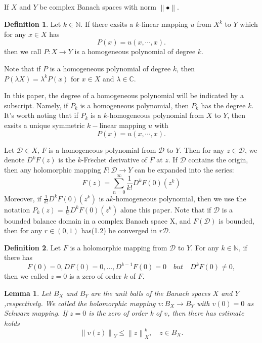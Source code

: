 \documentclass{birkjour}
\theoremstyle{plain}
\newtheorem{lem}{Lemma}
\theoremstyle{definition}
\newtheorem{defn}{Definition}
\theoremstyle{definition}
\begin{document}
If $X$ and $Y$ be complex Banach spaces with norm $\left\|\bullet\right\|$.
\begin{defn}
	Let $k \in \mathbb{N}$. If there exsits a $k$-linear mapping $u$ from $X^k$ to $Y$ which for any $x \in X$ has
	\begin{equation*}
		P(x)=u(x,\cdots ,x).
	\end{equation*}
	then we call $P:X \to Y$ is a homogeneous polynomial of degree $k$.	
\end{defn}
Note that if $P$ is a homogeneous polynomial of degree $k$, then $P(\lambda X)=\lambda ^kP(x)$ for $x \in X $ and $\lambda  \in \mathbb{C}$.
\par
In this paper, the degree of a homogeneous polynomial will be indicated by a subscript. Namely, if $P_k$ is a homogeneous polynomial, then $P_k$ has the degree $k$. It's worth noting that if $P_k$ is a $k$-homogeneous polynomial from $X$ to $Y$, then exsits a unique symmetric $k-$linear mapping $u$ with
\begin{equation*}
	P(x)=u(x,\cdots ,x).
\end{equation*}
\par
Let $\mathcal{D} \in X$, $F$ is a homogeneous polynomial from $\mathcal{D}$ to $Y$. Then for any $z \in \mathcal{D} $, we denote $D^kF(z)$ is the $k$-Fr$\acute{e}$chet derivative of $F$ at $z$. If $\mathcal{D}$ contains the origin, then any holomorphic mapping $F:\mathcal{D} \to Y$ can be expanded into the series:
\begin{equation}
	F(z)=\sum_{n=0}^{\infty} \frac{1}{k!} D^kF(0)(z^k)
\end{equation}
Moreover, if $ \frac{1}{k!} D^kF(0)(z^k)$ is a$k$-homogeneous polynomial, then we use the notation $P_k(z)= \frac{1}{k!} D^kF(0)(z^k)$ alone this paper. Note that if $\mathcal{D}$ is a bounded balance domain in a complex Banach space X, and $F(\mathcal{D})$ is bounded, then for any $r \in \left ( 0,1 \right ) $ has(1.2) be converged in $r\mathcal{D}$.
\par
\begin{defn}
	Let $F$ is a holomorphic mapping from $\mathcal{D}$ to $Y$. For any $k \in \mathbb{N} $, if there has
	\begin{equation*}
		F(0)=0,DF(0)=0,\dots ,D^{k-1}F(0)=0 \quad but \quad D^kF(0)\ne0,
	\end{equation*}
	then we called $z=0$ is a zero of order $k$ of $F$.
\end{defn}
\begin{lem}\cite{ref25}
	Let $B_X$ and $B_Y$ are the unit balls of the Banach spaces $X$ and $Y$,respectively. We called the holomorphic mapping $v:B_X \to B_Y$ with $v(0)=0$ as Schwarz mapping.
	If $z=0$ is the zero of order k of $v$, then there has estimate holds
	\begin{equation}
		\left \|v(z) \right \|_Y \le \left \| z \right \| ^k_X,\quad z\in B_X.
	\end{equation}
\end{lem}
\end{document}
